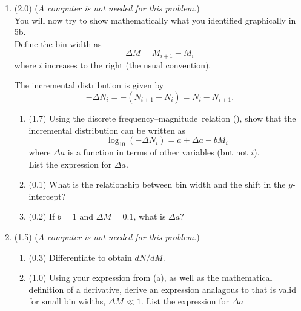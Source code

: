 \documentclass[11pt,titlepage,fleqn]{article}
\newcommand{\fmag}{frequency--magnitude}
\begin{document}
\begin{enumerate}

\pagebreak
\item (2.0) ({\em A computer is not needed for this problem.}) \\
You will now try to show mathematically what you identified graphically in 5b. \\
Define the bin width as
%
\begin{equation}
\Delta M = M_{i+1} - M_i
\label{dM}
\end{equation}
%
where $i$ increases to the right (the usual convention).

The incremental distribution is given by
%
\begin{equation}
-\Delta N_i = -(N_{i+1} - N_i) = N_i - N_{i+1}.
\end{equation}
%
\begin{enumerate}
\item (1.7) Using the discrete \fmag\ relation (), show that the incremental distribution can be written as
%
\begin{equation}
\log_{10}(-\Delta N_i) = a + \Delta a - b M_i
\label{inc}
\end{equation}
%
where $\Delta a$ is a function in terms of other variables (but not $i$). \\
List the expression for $\Delta a$.


\item (0.1) What is the relationship between bin width and the shift in the $y$-intercept?

\item (0.2) If $b = 1$ and $\Delta M = 0.1$, what is $\Delta a$?
\end{enumerate}


\item  (1.5) ({\em A computer is not needed for this problem.})
%
\begin{enumerate}
\item (0.3) Differentiate  to obtain $d N/ d M$.


\item (1.0) Using your expression from (a), as well as the mathematical definition of a derivative, derive an expression analagous to  that is valid for small bin widths, $\Delta M \ll 1$. List the expression for $\Delta a$


\end{enumerate}
\end{enumerate}
\end{document}
